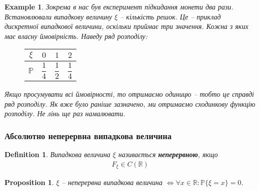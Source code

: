 \documentclass[a4paper, 10pt]{article}
\theoremstyle{theoremdd}
\newtheorem{definition}[theorem]{Definition}
\newtheorem{example}[theorem]{Example}
\newtheorem{proposition}[theorem]{Proposition}
\begin{document}
\begin{example}
Зокрема в нас був експеримент підкидання монети два рази. Встановлювали випадкову величину $\xi$ -- кількість решок. Це -- приклад дискретної випадкової величини, оскільки приймає три значення. Кожна з яких має власну ймовірність. Наведу ряд розподілу:
\begin{figure}[H]
\centering
\begin{tabular}{c|c|c|c}
$\xi$ & $0$ & $1$ & $2$ \\
\hline
$\mathbb{P}$ & $\dfrac{1}{4}$ & $\dfrac{1}{2}$ & $\dfrac{1}{4}$
\end{tabular}
\end{figure}
\noindent
Якщо просумувати всі ймовірності, то отримаємо одиницю -- тобто це справді ряд розподілу. Як вже було раніше зазначено, ми отримаємо сходинкову функцію розподілу. Не лінь ще раз намалювати.
\begin{figure}[H]
\centering
{}
\end{figure}
\end{example}

\subsubsection{Абсолютно неперервна випадкова величина}
\begin{definition}
Випадкова величина $\xi$ називається \textbf{неперервною}, якщо
\begin{align*}
F_\xi \in C(\mathbb{R})
\end{align*}
\end{definition}

\begin{proposition}
$\xi$ -- неперервна випадкова величина $\iff \forall x \in \mathbb{R}: \mathbb{P}\{\xi = x\} = 0$.
\end{proposition}
\end{document}
